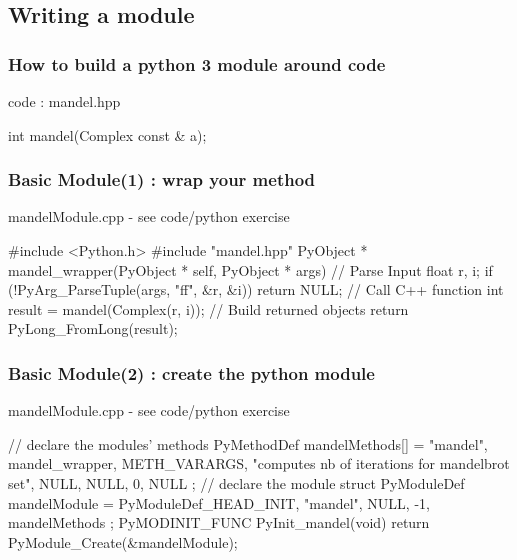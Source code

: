 \subsection[module]{Writing a module}

\begin{frame}[fragile]
  \frametitle{How to build a python 3 module around \cpp code}
  \begin{block}{\cpp code : mandel.hpp}
    \begin{cppcode*}{}
      int mandel(Complex const & a);
    \end{cppcode*}
  \end{block}
\end{frame}

\begin{frame}[fragile]
  \frametitle{Basic Module(1) : wrap your method}
  \begin{block}{mandelModule.cpp - see code/python exercise}
    \begin{cppcode*}{}
      #include <Python.h>
      #include "mandel.hpp"
      PyObject * mandel_wrapper(PyObject * self,
                                PyObject * args) {
        // Parse Input
        float r, i;
        if (!PyArg_ParseTuple(args, "ff", &r, &i))
          return NULL;
        // Call C++ function
        int result = mandel(Complex(r, i));
        // Build returned objects
        return PyLong_FromLong(result);
      }
    \end{cppcode*}
  \end{block}
\end{frame}

\begin{frame}[fragile]
  \frametitle{Basic Module(2) : create the python module}
  \begin{block}{mandelModule.cpp - see code/python exercise}
    \begin{cppcode*}{}
      // declare the modules' methods
      PyMethodDef mandelMethods[] = {
          {"mandel", mandel_wrapper, METH_VARARGS,
          "computes nb of iterations for mandelbrot set"},
          {NULL, NULL, 0, NULL}
      };
      // declare the module
      struct PyModuleDef mandelModule = {
        PyModuleDef_HEAD_INIT,
        "mandel", NULL, -1, mandelMethods
      };
      PyMODINIT_FUNC PyInit_mandel(void) {
        return PyModule_Create(&mandelModule);
      }
    \end{cppcode*}
  \end{block}
\end{frame}

